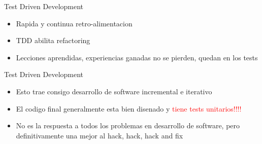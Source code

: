 \begin{frame}{Test Driven Development} 
    \begin{itemize}
        \item Rapida y continua retro-alimentacion
        \item TDD abilita refactoring
        \item Lecciones aprendidas, experiencias ganadas no se pierden, quedan en los tests
    \end{itemize}
\end{frame}

\begin{frame}{Test Driven Development} 
    \begin{itemize}
        \item Esto trae consigo desarrollo de software incremental e iterativo
        \item El codigo final generalmente esta bien disenado y 
            \textcolor{red}{tiene tests unitarios!!!!}
        \item No es la respuesta a todos los problemas en desarrollo de software, pero
            definitivamente una mejor al hack, hack, hack and fix
    \end{itemize}
\end{frame}
